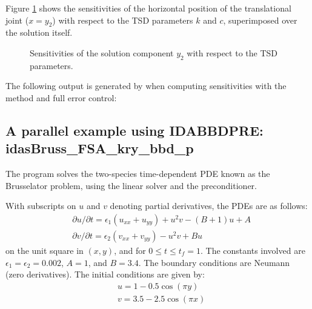 Figure \ref{f:x2sensi} shows the sensitivities of the horizontal position of the
translational joint ($x = y_2$) with respect to the TSD parameters $k$ and $c$,
superimposed over the solution itself.
\begin{figure}[h]
  {\centerline{}}
  \caption{Sensitivities of the solution component $y_2$ with respect to the TSD parameters.}
  \label{f:x2sensi}
\end{figure}

The following output is generated by  when computing
sensitivities with the  method and full error control:




\subsection{A parallel example using IDABBDPRE: idasBruss\_FSA\_kry\_bbd\_p}
\label{ss:idasBruss_FSA_kry_bbd_p}

The  program solves the two-species time-dependent
PDE known as the Brusselator problem, using the {\idaspgmr} linear solver and the
{\idabbdpre} preconditioner.

With subscripts on $u$ and $v$ denoting partial derivatives, the PDEs
are as follows:
\begin{equation*}
\begin{split}
  &\partial u / \partial t = \epsilon_1 (u_{xx} + u_{yy})
                              + u^2 v - (B + 1) u + A \\
  &\partial v / \partial t = \epsilon_2 (v_{xx} + v_{yy})
                              - u^2 v + B  u
\end{split}
\end{equation*}
on the unit square in $(x,y)$, and for $0 \leq t \leq t_f = 1$.
The constants involved are $\epsilon_1 = \epsilon_2 = 0.002$, $A = 1$,
and $B = 3.4$.  The boundary conditions are Neumann (zero derivatives).
The initial conditions are given by:
\begin{equation*}
\begin{split}
  &u = 1 - 0.5 \cos(\pi y) \\
  &v = 3.5 - 2.5 \cos(\pi x)
\end{split}
\end{equation*}

